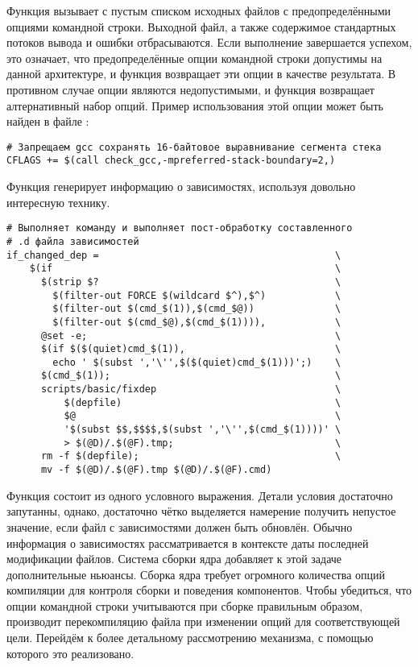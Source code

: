 Функция вызывает  с пустым списком исходных файлов
с предопределёнными опциями командной строки. Выходной файл,
а также содержимое стандартных потоков вывода и ошибки отбрасываются.
Если выполнение  завершается успехом, это означает, что
предопределённые опции командной строки допустимы на данной архитектуре,
и функция возвращает эти опции в качестве результата. В противном
случае опции являются недопустимыми, и функция возвращает алтернативный
набор опций. Пример использования этой опции может быть найден в файле
:

\begin{verbatim}
# Запрещаем gcc сохранять 16-байтовое выравнивание сегмента стека
CFLAGS += $(call check_gcc,-mpreferred-stack-boundary=2,)
\end{verbatim}

Функция  генерирует информацию о
зависимостях, используя довольно интересную технику.

\begin{verbatim}
# Выполняет команду и выполняет пост-обработку составленного
# .d файла зависимостей
if_changed_dep =                                         \
    $(if                                                 \
      $(strip $?                                         \
        $(filter-out FORCE $(wildcard $^),$^)            \
        $(filter-out $(cmd_$(1)),$(cmd_$@))              \
        $(filter-out $(cmd_$@),$(cmd_$(1)))),            \
      @set -e;                                           \
      $(if $($(quiet)cmd_$(1)),                          \
        echo ' $(subst ','\'',$($(quiet)cmd_$(1)))';)    \
      $(cmd_$(1));                                       \
      scripts/basic/fixdep                               \
          $(depfile)                                     \
          $@                                             \
          '$(subst $$,$$$$,$(subst ','\'',$(cmd_$(1))))' \
          > $(@D)/.$(@F).tmp;                            \
      rm -f $(depfile);                                  \
      mv -f $(@D)/.$(@F).tmp $(@D)/.$(@F).cmd)
\end{verbatim}

Функция состоит из одного условного выражения. Детали условия
достаточно запутанны, однако, достаточно чётко выделяется
намерение получить непустое значение, если файл с зависимостями
должен быть обновлён. Обычно информация о зависимостях
рассматривается в контексте даты последней модификации файлов.
Система сборки ядра добавляет к этой задаче дополнительные ньюансы.
Сборка ядра требует огромного количества опций компиляции для
контроля сборки и поведения компонентов. Чтобы убедиться, что
опции командной строки учитываются при сборке правильным образом,
\Makefile{} производит перекомпиляцию файла при изменении опций
для соответствующей цели. Перейдём к более детальному рассмотрению
механизма, с помощью которого это реализовано.

